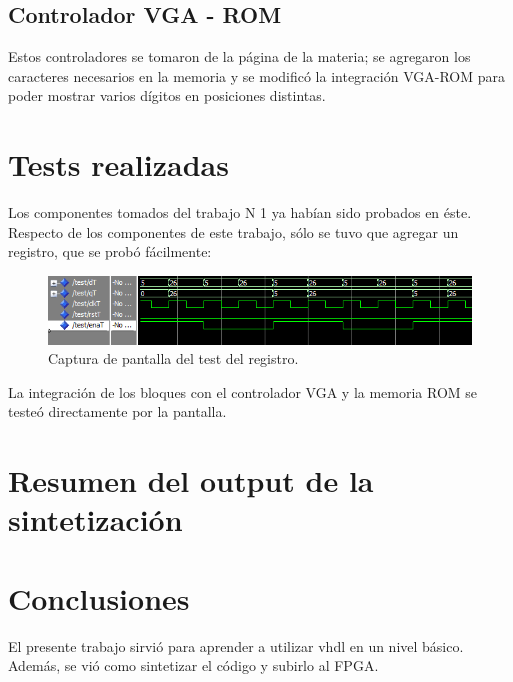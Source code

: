 \documentclass[a4paper,10pt]{article}
\begin{document}
\subsection{Controlador VGA - ROM}
Estos controladores se tomaron de la página de la materia; se agregaron los caracteres necesarios en la memoria y se modificó la integración VGA-ROM para poder mostrar varios dígitos en posiciones distintas.

\section{Tests realizadas}
Los componentes tomados del trabajo N 1 ya habían sido probados en éste. Respecto de los componentes de este trabajo, sólo se tuvo que agregar un registro, que se probó fácilmente:
	\begin{figure}[h]
		\centering
		\includegraphics[width=17cm]{img/testReg.png}
		\caption{Captura de pantalla del test del registro.}
	\end{figure}
	
La integración de los bloques con el controlador VGA y la memoria ROM se testeó directamente por la pantalla.
\section{Resumen del output de la sintetización}


\section{Conclusiones}
El presente trabajo sirvió para aprender a utilizar vhdl en un nivel básico. Además, se vió como sintetizar el código y subirlo al FPGA.

\end{document}

